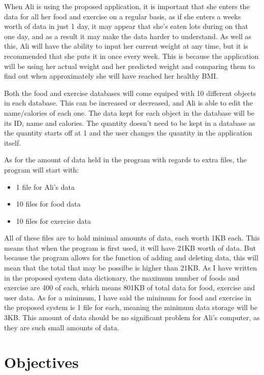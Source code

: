 When Ali is using the proposed application, it is important that she enters the data for all her food and exercise on a regular basis, as if she enters a weeks worth of data in just 1 day, it may appear that she's eaten lots during on that one day, and as a result it may make the data harder to understand. As well as this, Ali will have the ability to input her current weight at any time, but it is recommended that she puts it in once every week. This is because the application will be using her actual weight and her predicted weight and comparing them to find out when approximately she will have reached her healthy BMI.

Both the food and exercise databases will come equiped with 10 different objects in each database. This can be increased or decreased, and Ali is able to edit the name/calories of each one. The data kept for each object in the database will be its ID, name and calories. The quantity doesn't need to be kept in a database as the quantity starts off at 1 and the user changes the quantity in the application itself.

As for the amount of data held in the program with regards to extra files, the program will start with:

\begin{itemize}
\item 1 file for Ali's data
\item 10 files for food data
\item 10 files for exercise data
\end{itemize}

All of these files are to hold minimal amounts of data, each worth 1KB each. This means that when the program is first used, it will have 21KB worth of data. But because the program allows for the function of adding and deleting data, this will mean that the total that may be possilbe is higher than 21KB. As I have written in the proposed system data dictionary, the maximum number of foods and exercise are 400 of each, which means 801KB of total data for food, exercise and user data. As for a minimum, I have said the minimum for food and exercise in the proposed system is 1 file for each, meaning the minimum data storage will be 3KB. This amount of data should be no significant problem for Ali's computer, as they are such small amounts of data.

\section{Objectives}

